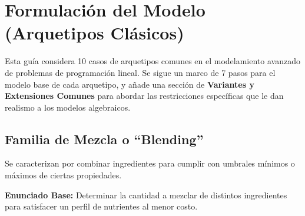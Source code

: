 \documentclass{article}
\begin{document}
	\newpage
	
	\section{Formulación del Modelo (Arquetipos Clásicos)}
	
	Esta guía considera 10 casos de arquetipos comunes en el modelamiento avanzado de problemas de programación lineal. Se sigue un marco de 7 pasos para el modelo base de cada arquetipo, y añade una sección de \textbf{Variantes y Extensiones Comunes} para abordar las restricciones específicas que le dan realismo a los modelos algebraicos.
	
	\subsection{Familia de Mezcla o ``Blending''}
	Se caracterizan por combinar ingredientes para cumplir con umbrales mínimos o máximos de ciertas propiedades.
	
	\textbf{Enunciado Base:} Determinar la cantidad a mezclar de distintos ingredientes para satisfacer un perfil de nutrientes al menor costo.
	
\end{document}
